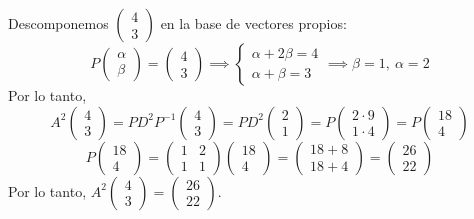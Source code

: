 \begin{prob}
\begin{myproof}
Descomponemos $\begin{pmatrix} 4 \\ 3 \end{pmatrix}$ en la base de vectores propios:
\[
P \begin{pmatrix} \alpha \\ \beta \end{pmatrix} = \begin{pmatrix} 4 \\ 3 \end{pmatrix}
\implies
\begin{cases}
\alpha + 2\beta = 4 \\
\alpha + \beta = 3
\end{cases}
\implies \beta = 1, \ \alpha = 2
\]
Por lo tanto,
\[
A^2\begin{pmatrix} 4 \\ 3 \end{pmatrix} = P D^2 P^{-1} \begin{pmatrix} 4 \\ 3 \end{pmatrix} = P D^2 \begin{pmatrix} 2 \\ 1 \end{pmatrix} = P \begin{pmatrix} 2\cdot 9 \\ 1\cdot 4 \end{pmatrix} = P \begin{pmatrix} 18 \\ 4 \end{pmatrix}
\]
\[
P \begin{pmatrix} 18 \\ 4 \end{pmatrix} = \begin{pmatrix} 1 & 2 \\ 1 & 1 \end{pmatrix} \begin{pmatrix} 18 \\ 4 \end{pmatrix} = \begin{pmatrix} 18 + 8 \\ 18 + 4 \end{pmatrix} = \begin{pmatrix} 26 \\ 22 \end{pmatrix}
\]
Por lo tanto, $A^2\begin{pmatrix} 4 \\ 3 \end{pmatrix} = \begin{pmatrix} 26 \\ 22 \end{pmatrix}$.
\end{myproof}
\end{prob}

